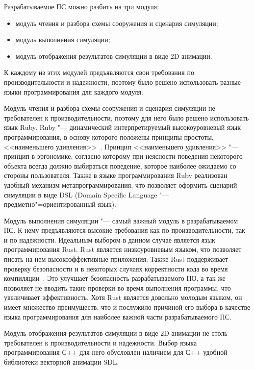 Разрабатываемое ПС можно разбить на три модуля:
\begin{itemize}
  \item модуль чтения и разбора схемы сооружения и сценария симуляции;
  \item модуль выполнения симуляции;
  \item модуль отображения результатов симуляции в виде 2D анимации.
\end{itemize}

К каждому из этих модулей предъявляются свои требования по производительности и надежности, поэтому было решено использовать разные языки программирования для каждого модуля.

Модуль чтения и разбора схемы сооружения и сценария симуляции не требователен к производительности, поэтому для него было решено использовать язык Ruby.
Ruby "--- динамический интерпретируемый высокоуровневый язык программирования, в основу которого положены принципы простоты, <<наименьшего удивления>>~\cite{ruby_main}.
Принцип <<наименьшего удивления>> "--- принцип в эргономике, согласно которому при неясности поведения некоторого объекта всегда должно выбираться поведение,
которое наиболее ожидаемо со стороны пользователя.
Также в языке программирования Ruby реализован удобный механизм метапрограммирования, что позволяет оформить сценарий симуляции в виде DSL (Domain Specific Language "--- предметно"=ориентированный язык).

Модуль выполнения симуляции "--- самый важный модуль в разрабатываемом ПС. К нему предъявляются высокие требования как по производительности, так и по надежности.
Идеальным выбором в данном случае является язык программирования Rust. Rust является низкоуровневым языком, что позволяет писать на нем высокоэффективные приложения.
Также Rust поддерживает проверку безопасности и в некоторых случаях корректности кода во время компиляции~\cite{rust_main}.
Это улучшает безопасность разрабатываемого ПО, а так же позволяет не вводить такие проверки во время выполнения программы, что увеличивает эффективность.
Хотя Rust является довольно молодым языком, он имеет множество преимуществ, что и послужило причиной его выбора в качестве языка программирования для наиболее важной части разрабатываемого ПС.

Модуль отображения результатов симуляции в виде 2D анимации не столь требователен к производительности и надежности.
Выбор языка программирования С++ для него обусловлен наличием для С++ удобной библиотеки векторной анимации SDL.
